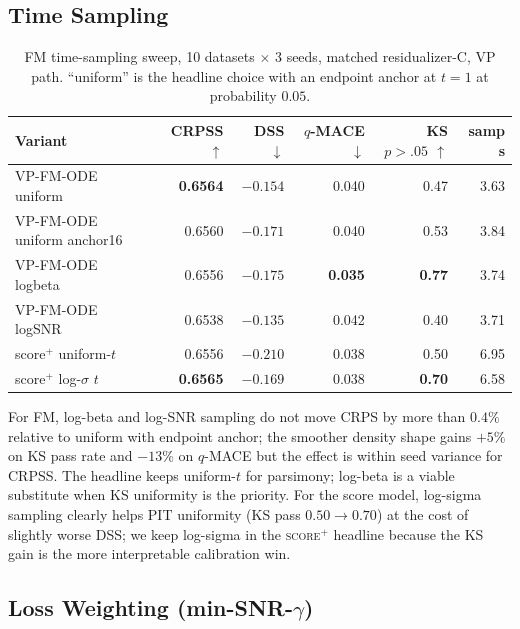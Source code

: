 \documentclass{uai2026}
\begin{document}
\subsection{Time Sampling}\label{app:t-sampling}

\begin{table}[!h]
  \centering
  \caption{FM time-sampling sweep, 10 datasets $\times$ 3 seeds, matched residualizer-C, VP path. ``uniform'' is the headline choice with an endpoint anchor at $t=1$ at probability $0.05$.}\label{tab:t-sampling}
  \footnotesize
  \begin{tabular}{lrrrrr}
    \toprule
    Variant & CRPSS $\uparrow$ & DSS $\downarrow$ & $q$-MACE $\downarrow$ & KS $p{>}.05$ $\uparrow$ & samp s \\
    \midrule
    VP-FM-ODE uniform           & \textbf{0.6564} & $-0.154$ & 0.040 & 0.47 & 3.63 \\
    VP-FM-ODE uniform anchor16  & 0.6560 & \textbf{$-0.171$} & 0.040 & 0.53 & 3.84 \\
    VP-FM-ODE logbeta           & 0.6556 & $-0.175$ & \textbf{0.035} & \textbf{0.77} & 3.74 \\
    VP-FM-ODE logSNR            & 0.6538 & $-0.135$ & 0.042 & 0.40 & 3.71 \\
    \midrule
    score$^+$ uniform-$t$       & 0.6556 & \textbf{$-0.210$} & 0.038 & 0.50 & 6.95 \\
    score$^+$ log-$\sigma$ $t$  & \textbf{0.6565} & $-0.169$ & 0.038 & \textbf{0.70} & 6.58 \\
    \bottomrule
  \end{tabular}
\end{table}

For FM, log-beta and log-SNR sampling do not move CRPS by more than $0.4\%$ relative to uniform with endpoint anchor; the smoother density shape gains $+5\%$ on KS pass rate and $-13\%$ on $q$-MACE but the effect is within seed variance for CRPSS. The headline keeps uniform-$t$ for parsimony; log-beta is a viable substitute when KS uniformity is the priority. For the score model, log-sigma sampling clearly helps PIT uniformity (KS pass $0.50 \to 0.70$) at the cost of slightly worse DSS; we keep log-sigma in the \textsc{score$^+$} headline because the KS gain is the more interpretable calibration win.

\subsection{Loss Weighting (min-SNR-$\gamma$)}\label{app:loss-weighting}
\end{document}
